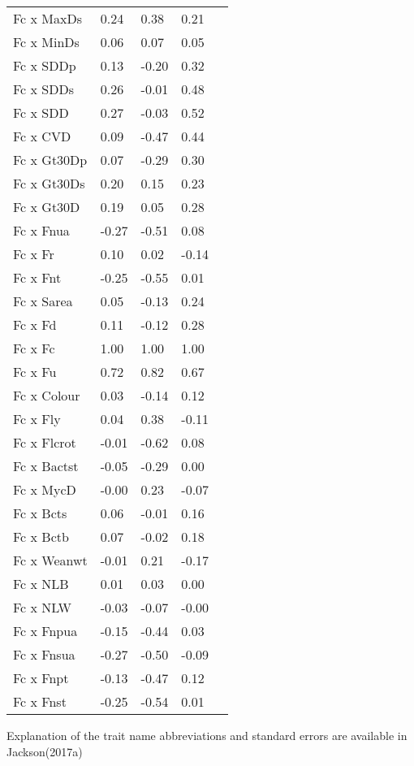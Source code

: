 \begin{table}[h]
\begin{tabular}{|p{1.2in}|p{0.8in}|p{0.8in}|p{0.8in}|p{0.8in}|}
 Fc x MaxDs & 0.24 & 0.38 & 0.21 \\
 Fc x MinDs & 0.06 & 0.07 & 0.05  \\
 Fc x SDDp & 0.13 & -0.20 & 0.32 \\
 Fc x SDDs & 0.26 & -0.01 & 0.48 \\
 Fc x SDD & 0.27 & -0.03 & 0.52 \\
 Fc x CVD & 0.09 & -0.47 & 0.44 \\
 Fc x Gt30Dp & 0.07 & -0.29 & 0.30 \\  
 Fc x Gt30Ds & 0.20 & 0.15 & 0.23 \\
 Fc x Gt30D & 0.19 & 0.05 & 0.28 \\
 Fc x Fnua & -0.27 & -0.51 & 0.08 \\
 Fc x Fr & 0.10 & 0.02 & -0.14 \\
 Fc x Fnt & -0.25 & -0.55 & 0.01 \\
 Fc x Sarea & 0.05 & -0.13 & 0.24 \\
 Fc x Fd & 0.11 & -0.12 & 0.28 \\
 Fc x Fc & 1.00 & 1.00 & 1.00 \\
 Fc x Fu & 0.72 & 0.82 & 0.67 \\
 Fc x Colour & 0.03 & -0.14 & 0.12 \\
 Fc x Fly & 0.04 & 0.38 & -0.11 \\
 Fc x Flcrot & -0.01 & -0.62 & 0.08  \\
 Fc x Bactst & -0.05 & -0.29 & 0.00 \\
 Fc x MycD & -0.00 & 0.23 & -0.07 \\
 Fc x Bcts & 0.06 & -0.01 & 0.16 \\
 Fc x Bctb & 0.07 & -0.02 & 0.18 \\
 Fc x Weanwt & -0.01 & 0.21 & -0.17 \\
 Fc x NLB & 0.01 & 0.03 & 0.00 \\
 Fc x NLW & -0.03 & -0.07 & -0.00 \\
 Fc x Fnpua & -0.15 & -0.44 & 0.03 \\
 Fc x Fnsua & -0.27 & -0.50 & -0.09 \\
 Fc x Fnpt & -0.13 & -0.47 & 0.12 \\
 Fc x Fnst & -0.25 & -0.54 & 0.01 \\ \hline
\end{tabular}
\footnotesize

Explanation of the trait name abbreviations and standard errors are available in Jackson(2017a)~\cite{jackson-2017a}
\normalsize
\end{table}

%
